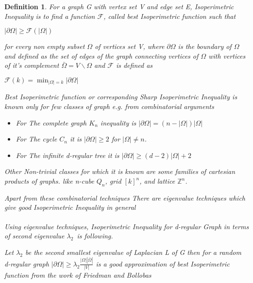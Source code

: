 \documentclass[oneside]{book}
\newtheorem{mydef}{Definition}
\begin{document}
\begin{mydef}
  
For a graph G with vertex set V and edge set E, Isoperimetric Inequality is to find a function $\mathcal{F}$, called best  Isoperimetric function such that  \begin{center}
  $|\partial \Omega| \geq \mathcal{F}(|\Omega|)$  
\end{center}   
for every non empty subset $\Omega$ of vertices set V, where $\partial \Omega$ is the boundary of $\Omega$  and defined as the set of edges of the graph connecting vertices of $\Omega$ with vertices of it's complement $\bar{\Omega} = V \backslash \Omega $ and $\mathcal{F}$ is defined as  \begin{center}
    $\mathscr{F}(k)=\min _{|\Omega|=k}|\partial \Omega|$\par
\end{center} 
 Best Isoperimetric function or corresponding Sharp Isoperimetric Inequality is known only for few classes of graph e.g.
from combinatorial arguments 
\par
\begin{itemize}
    \item For The complete graph $K_{n}$ inequality is $|\partial \Omega|=(n-|\Omega|) | \Omega|$ 
    \item For The cycle $C_{n}$ it is  $|\partial \Omega|\geq 2$ for $|\Omega| \neq n$.
    \item For The infinite d-regular tree it is $|\partial \Omega| \geq(d-2)| \Omega|+2$\par
\end{itemize}
 
  
     
     Other Non-trivial classes for which it is known are some families of cartesian products of graphs. like 
n-cube $Q_{n}$, 
grid $[k]^{n}$,
and lattice $\mathbb{Z}^{n}$.
\par
 Apart from these combinatorial techniques There are eigenvalue techniques which give good Isoperimetric Inequality in general \\\\
 
 Using eigenvalue techniques, 
 Isoperimetric Inequality for d-regular Graph in terms of second eigenvalue $\lambda_2$\ is following. \par
  
 Let $\lambda_{2}$ be the second smallest eigenvalue of Laplacian L of G then for a random d-regular graph $|\partial \Omega| \geq \lambda_{2} \frac{|\Omega||\bar{\Omega}|}{|V|}$  is a good approximation of best Isoperimetric function from the work of Friedman and Bollobas  \par 
     

\end{mydef}
\end{document}
